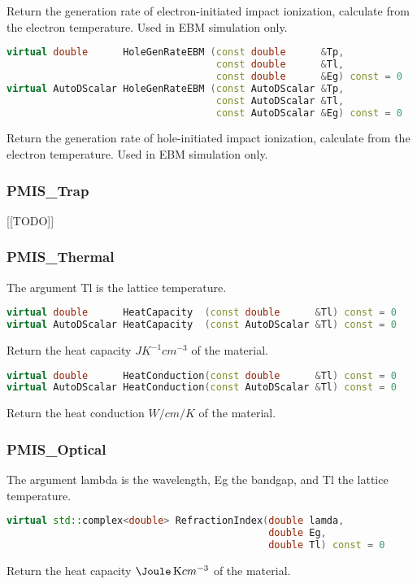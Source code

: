 \documentclass[oneside,12pt]{cgd_book}
\begin{document}
Return the generation rate of electron-initiated impact ionization, calculate from the electron
            temperature. Used in EBM simulation only.
\par
\begin{lstlisting}[language={C++}]
virtual double      HoleGenRateEBM (const double      &Tp,
                                    const double      &Tl,
                                    const double      &Eg) const = 0
virtual AutoDScalar HoleGenRateEBM (const AutoDScalar &Tp,
                                    const AutoDScalar &Tl,
                                    const AutoDScalar &Eg) const = 0
\end{lstlisting}
Return the generation rate of hole-initiated impact ionization, calculate from the electron
            temperature. Used in EBM simulation only.
\par
\subsubsection{PMIS\_Trap}
[[TODO]]
\par
\subsubsection{PMIS\_Thermal}
\label{sec:Extend:PMI:Ref:PMIS:Thermal}
The argument Tl is the lattice temperature.
\par
\begin{lstlisting}[language={C++}]
virtual double      HeatCapacity  (const double      &Tl) const = 0
virtual AutoDScalar HeatCapacity  (const AutoDScalar &Tl) const = 0
\end{lstlisting}
Return the heat capacity $JK^{-1}cm^{-3}$ of the
            material.
\par
\begin{lstlisting}[language={C++}]
virtual double      HeatConduction(const double      &Tl) const = 0
virtual AutoDScalar HeatConduction(const AutoDScalar &Tl) const = 0
\end{lstlisting}
Return the heat conduction $W/cm/K$ of the
            material.
\par
\subsubsection{PMIS\_Optical}
\label{sec:Extend:PMI:Ref:PMIS:Optical}
The argument lambda is the wavelength, Eg the
          bandgap, and Tl the lattice temperature.
\par
\begin{lstlisting}[language={C++}]
virtual std::complex<double> RefractionIndex(double lamda,
                                             double Eg,
                                             double Tl) const = 0
\end{lstlisting}
Return the heat capacity $\Joule\Inverse\Kelvin{}cm^{-3}$ of the
            material.
\par
\end{document}
